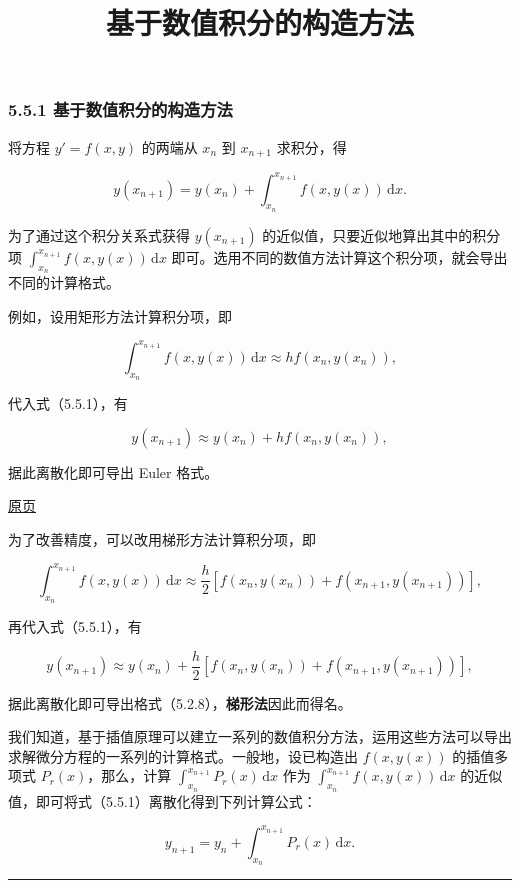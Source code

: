 \documentclass[
  10pt,
  fontset=fandol]{ctexart}
\title{基于数值积分的构造方法}
\author{}
\date{}
\begin{document}
\maketitle

\subsubsection{5.5.1 基于数值积分的构造方法}\label{ux57faux4e8eux6570ux503cux79efux5206ux7684ux6784ux9020ux65b9ux6cd5}

将方程 \(y'=f(x,y)\) 的两端从 \(x_n\) 到 \(x_{n+1}\) 求积分，得

\[
y(x_{n+1})=y(x_n)+\int_{x_n}^{x_{n+1}}f(x,y(x))\,\mathrm dx.
\tag{5.5.1}
\]

为了通过这个积分关系式获得 \(y(x_{n+1})\) 的近似值，只要近似地算出其中的积分项 \(\int_{x_n}^{x_{n+1}}f(x,y(x))\,\mathrm dx\) 即可。选用不同的数值方法计算这个积分项，就会导出不同的计算格式。

例如，设用矩形方法计算积分项，即

\[
\int_{x_n}^{x_{n+1}}f(x,y(x))\,\mathrm dx\approx hf(x_n,y(x_n)),
\]

代入式（5.5.1），有

\[
y(x_{n+1})\approx y(x_n)+hf(x_n,y(x_n)),
\]

据此离散化即可导出 Euler 格式。

\href{../../source-images/pdf-138.jpeg}{原页}

为了改善精度，可以改用梯形方法计算积分项，即

\[
\int_{x_n}^{x_{n+1}}f(x,y(x))\,\mathrm dx\approx\frac h2[f(x_n,y(x_n))+f(x_{n+1},y(x_{n+1}))],
\]

再代入式（5.5.1），有

\[
y(x_{n+1})\approx y(x_n)+\frac h2[f(x_n,y(x_n))+f(x_{n+1},y(x_{n+1}))],
\]

据此离散化即可导出格式（5.2.8），\textbf{梯形法}因此而得名。

我们知道，基于插值原理可以建立一系列的数值积分方法，运用这些方法可以导出求解微分方程的一系列的计算格式。一般地，设已构造出 \(f(x,y(x))\) 的插值多项式 \(P_r(x)\)，那么，计算 \(\int_{x_n}^{x_{n+1}}P_r(x)\,\mathrm dx\) 作为 \(\int_{x_n}^{x_{n+1}}f(x,y(x))\,\mathrm dx\) 的近似值，即可将式（5.5.1）离散化得到下列计算公式：

\[
y_{n+1}=y_n+\int_{x_n}^{x_{n+1}}P_r(x)\,\mathrm dx.
\tag{5.5.2}
\]

\begin{center}\rule{0.5\linewidth}{0.5pt}\end{center}
\end{document}
